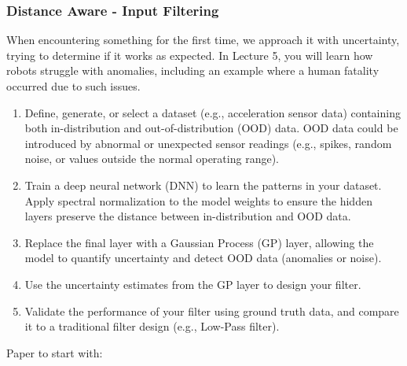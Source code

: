 \documentclass[a4paper]{article}
\begin{document}
\subsubsection{Distance Aware - Input Filtering}
When encountering something for the first time, we approach it with uncertainty, trying to determine if it works as expected. In Lecture 5, you will learn how robots struggle with anomalies, including an example where a human fatality occurred due to such issues. 
\begin{enumerate}
  \item Define, generate, or select a dataset (e.g., acceleration sensor data) containing both in-distribution and out-of-distribution (OOD) data. OOD data could be introduced by abnormal or unexpected sensor readings (e.g., spikes, random noise, or values outside the normal operating range).
  \item Train a deep neural network (DNN) to learn the patterns in your dataset. Apply spectral normalization to the model weights to ensure the hidden layers preserve the distance between in-distribution and OOD data.
  \item Replace the final layer with a Gaussian Process (GP) layer, allowing the model to quantify uncertainty and detect OOD data (anomalies or noise).
  \item Use the uncertainty estimates from the GP layer to design your filter.
  \item Validate the performance of your filter using ground truth data, and compare it to a traditional filter design (e.g., Low-Pass filter).
\end{enumerate}
Paper to start with: \citet{200610108v2}


%
\end{document}
